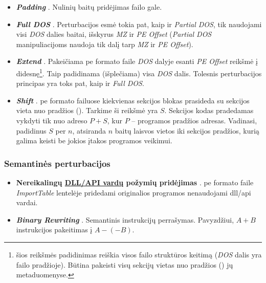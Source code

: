 \begin{itemize}
    \item \textbf{\textit{Padding}} \cite{demetrioAdversarialEXEmplesSurvey2021}. Nulinių baitų pridėjimas failo gale.
    \item \textbf{\textit{Full DOS}} \cite{demetrioAdversarialEXEmplesSurvey2021}. Perturbacijos esmė tokia pat, kaip ir \textit{Partial DOS}, tik naudojami visi \textit{DOS} dalies baitai, išskyrus \textit{MZ} ir \textit{PE Offset} (\textit{Partial DOS} manipuliacijoms naudoja tik dalį tarp \textit{MZ} ir \textit{PE Offset}).
    \item \textbf{\textit{Extend}} \cite{demetrioAdversarialEXEmplesSurvey2021}. Pakeičiama \acs{pe} formato faile \textit{DOS} dalyje esanti \textit{PE Offset} reikšmė į didesnę\footnote{\label{footnote:structure}šios reikšmės padidinimas reiškia visos failo struktūros keitimą (\textit{DOS} dalis yra failo pradžioje). Būtina pakeisti visų sekcijų vietas nuo pradžios () jų metaduomenyse.}. Taip padidinama (išplečiama) visa \textit{DOS} dalis. Tolesnis perturbacijos principas yra toks pat, kaip ir \textit{Full DOS}.
    \item \textbf{\textit{Shift}} \cite{demetrioAdversarialEXEmplesSurvey2021}. \acs{pe} formato failuose kiekvienas sekcijos blokas prasideda su sekcijos vieta nuo pradžios (). Tarkime ši reikšmė yra $S$. Sekcijos kodas pradedamas vykdyti tik nuo adreso $P+S$, kur $P$ -- programos pradžios adresas. Vadinasi, padidinus $S$ per $n$, atsiranda $n$ baitų laisvos vietos iki sekcijos pradžios, kurią galima keisti be jokios įtakos programos veikimui.
\end{itemize}
\subsubsection{Semantinės perturbacijos}\label{sec:literature:perturbations:semantic}
\begin{itemize}
    \item \textbf{Nereikalingų \hyperref[feature:dll]{DLL/API vardų} požymių pridėjimas} \cite{huGeneratingAdversarialMalware2017}. \acs{pe} formato faile \textit{ImportTable} lentelėje pridedami originalios programos nenaudojami \acs{dll}/\acs{api} vardai.
    \item \textbf{\textit{Binary Rewriting}} \cite{demetrioAdversarialEXEmplesSurvey2021}. Semantinis instrukcijų perrašymas. Pavyzdžiui, $A+B$ instrukcijos pakeitimas į $A-(-B)$.
\end{itemize}

